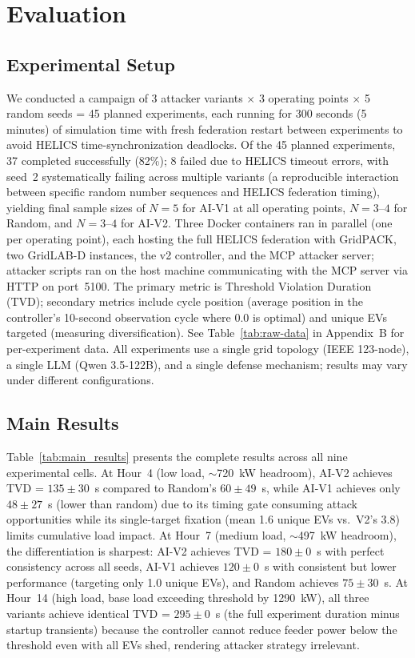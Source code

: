 
\section{Evaluation}\label{sec:evaluation}

\subsection{Experimental Setup}\label{sec:setup}

We conducted a campaign of 3 attacker variants $\times$ 3 operating points $\times$ 5 random seeds = 45 planned experiments, each running for 300 seconds (5 minutes) of simulation time with fresh federation restart between experiments to avoid HELICS time-synchronization deadlocks.
Of the 45 planned experiments, 37 completed successfully (82\%); 8 failed due to HELICS timeout errors, with seed~2 systematically failing across multiple variants (a reproducible interaction between specific random number sequences and HELICS federation timing), yielding final sample sizes of $N = 5$ for AI-V1 at all operating points, $N = 3$--$4$ for Random, and $N = 3$--$4$ for AI-V2.
Three Docker containers ran in parallel (one per operating point), each hosting the full HELICS federation with GridPACK, two GridLAB-D instances, the v2 controller, and the MCP attacker server; attacker scripts ran on the host machine communicating with the MCP server via HTTP on port~5100.
The primary metric is Threshold Violation Duration (TVD); secondary metrics include cycle position (average position in the controller's 10-second observation cycle where 0.0 is optimal) and unique EVs targeted (measuring diversification). See Table~\ref{tab:raw-data} in Appendix~B for per-experiment data.
All experiments use a single grid topology (IEEE 123-node), a single LLM (Qwen 3.5-122B), and a single defense mechanism; results may vary under different configurations.

\subsection{Main Results}\label{sec:results}

Table~\ref{tab:main_results} presents the complete results across all nine experimental cells.
At Hour~4 (low load, ${\sim}$720~kW headroom), AI-V2 achieves TVD = $135 \pm 30$~s compared to Random's $60 \pm 49$~s, while AI-V1 achieves only $48 \pm 27$~s (lower than random) due to its timing gate consuming attack opportunities while its single-target fixation (mean 1.6 unique EVs vs.\ V2's 3.8) limits cumulative load impact.
At Hour~7 (medium load, ${\sim}$497~kW headroom), the differentiation is sharpest: AI-V2 achieves TVD = $180 \pm 0$~s with perfect consistency across all seeds, AI-V1 achieves $120 \pm 0$~s with consistent but lower performance (targeting only 1.0 unique EVs), and Random achieves $75 \pm 30$~s.
At Hour~14 (high load, base load exceeding threshold by 1290~kW), all three variants achieve identical TVD = $295 \pm 0$~s (the full experiment duration minus startup transients) because the controller cannot reduce feeder power below the threshold even with all EVs shed, rendering attacker strategy irrelevant.

